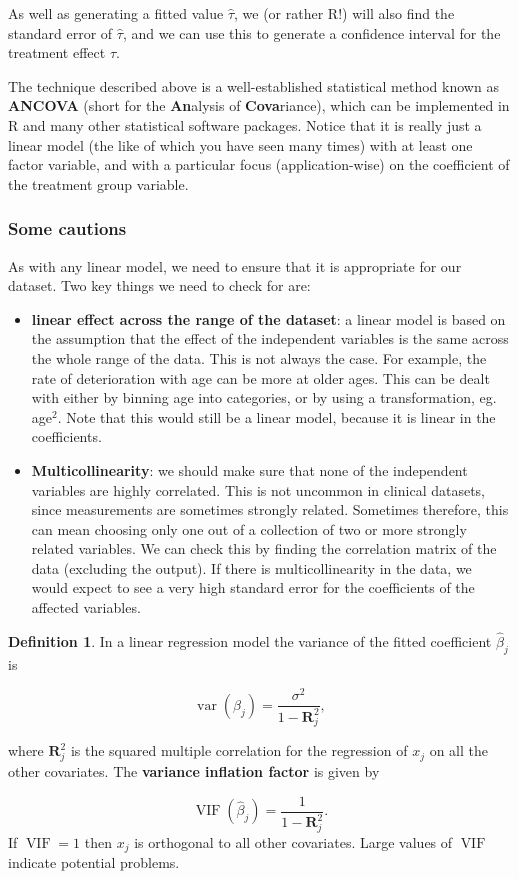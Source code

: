 \documentclass[
  openany]{book}
\providecommand{\tightlist}{%
  \setlength{\itemsep}{0pt}\setlength{\parskip}{0pt}}
\theoremstyle{definition}
\newtheorem{definition}{Definition}[chapter]
\theoremstyle{definition}
\theoremstyle{definition}
\theoremstyle{definition}
\theoremstyle{remark}
\begin{document}
As well as generating a fitted value \(\hat{\tau}\), we (or rather R!) will also find the standard error of \(\hat\tau\), and we can use this to generate a confidence interval for the treatment effect \(\tau\).

The technique described above is a well-established statistical method known as \textbf{ANCOVA} (short for the \textbf{An}alysis of \textbf{Cova}riance), which can be implemented in R and many other statistical software packages. Notice that it is really just a linear model (the like of which you have seen many times) with at least one factor variable, and with a particular focus (application-wise) on the coefficient of the treatment group variable.

\subsubsection*{Some cautions}\label{some-cautions}

As with any linear model, we need to ensure that it is appropriate for our dataset. Two key things we need to check for are:

\begin{itemize}
\tightlist
\item
  \textbf{linear effect across the range of the dataset}: a linear model is based on the assumption that the effect of the independent variables is the same across the whole range of the data. This is not always the case. For example, the rate of deterioration with age can be more at older ages. This can be dealt with either by binning age into categories, or by using a transformation, eg. age\(^2\). Note that this would still be a linear model, because it is linear in the coefficients.
\item
  \textbf{Multicollinearity}: we should make sure that none of the independent variables are highly correlated. This is not uncommon in clinical datasets, since measurements are sometimes strongly related. Sometimes therefore, this can mean choosing only one out of a collection of two or more strongly related variables. We can check this by finding the correlation matrix of the data (excluding the output). If there is multicollinearity in the data, we would expect to see a very high standard error for the coefficients of the affected variables.
\end{itemize}

\begin{definition}
In a linear regression model the variance of the fitted coefficient \(\hat\beta_j\) is

\[\operatorname{var}\left(\hat\beta_j\right) = \frac{\sigma^2}{1-\mathbf{R}^2_j},\]

where \(\mathbf{R}^2_j\) is the squared multiple correlation for the regression of \(x_j\) on all the other covariates. The \textbf{variance inflation factor} is given by

\[\operatorname{VIF}\left(\hat\beta_j\right) = \frac{1}{1-\mathbf{R}^2_j}.\]
If \(\operatorname{VIF}=1\) then \(x_j\) is orthogonal to all other covariates. Large values of \(\operatorname{VIF}\) indicate potential problems.
\end{definition}
\end{document}
